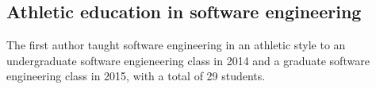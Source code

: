 \subsection{Athletic education in software engineering}

The first author taught software engineering in an athletic style to an undergraduate software engieneering class in 2014 and a graduate software engineering class in 2015, with a total of 29 students. 